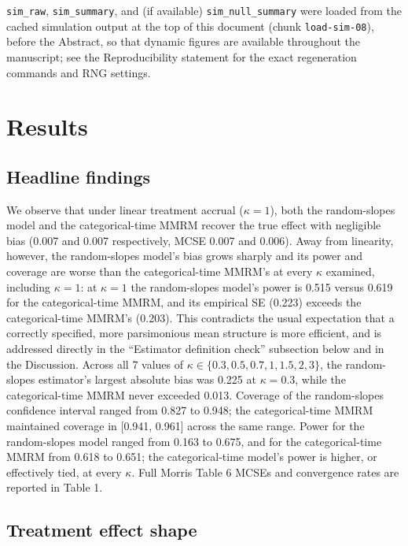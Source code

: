 \documentclass[
  11pt,
]{article}
\begin{document}
\texttt{sim\_raw}, \texttt{sim\_summary}, and (if available) \texttt{sim\_null\_summary}
were loaded from the cached simulation output at the top of this
document (chunk \texttt{load-sim-08}), before the Abstract, so that
dynamic figures are available throughout the manuscript; see the
Reproducibility statement for the exact regeneration commands and
RNG settings.

\section{Results}\label{results}

\subsection{Headline findings}\label{headline-findings}

We observe that under linear treatment accrual (\(\kappa = 1\)),
both the random-slopes model and the categorical-time MMRM
recover the true effect with negligible bias
(0.007 and
0.007 respectively,
MCSE 0.007 and
0.006). Away from
linearity, however, the random-slopes model's bias grows
sharply and its power and coverage are worse than the
categorical-time MMRM's at every \(\kappa\) examined, including
\(\kappa = 1\): at \(\kappa = 1\) the random-slopes model's power
is 0.515 versus
0.619 for the
categorical-time MMRM, and its empirical SE
(0.223) exceeds the
categorical-time MMRM's
(0.203). This contradicts
the usual expectation that a correctly specified, more
parsimonious mean structure is more efficient, and is
addressed directly in the ``Estimator definition check''
subsection below and in the Discussion. Across all
7 values of \(\kappa \in
\{0.3, 0.5, 0.7, 1, 1.5, 2, 3\}\), the random-slopes
estimator's largest absolute bias was
0.225 at
\(\kappa = 0.3\), while the
categorical-time MMRM never exceeded
0.013.
Coverage of the random-slopes confidence interval ranged
from 0.827 to
0.948; the
categorical-time MMRM maintained coverage in
{[}0.941,
0.961{]} across the same
range. Power for the random-slopes model ranged from
0.163 to
0.675, and for the
categorical-time MMRM from
0.618 to
0.651; the categorical-time
model's power is higher, or effectively tied, at every
\(\kappa\). Full Morris Table 6 MCSEs and convergence rates are
reported in Table 1.

\subsection{Treatment effect shape}\label{treatment-effect-shape}
\end{document}
